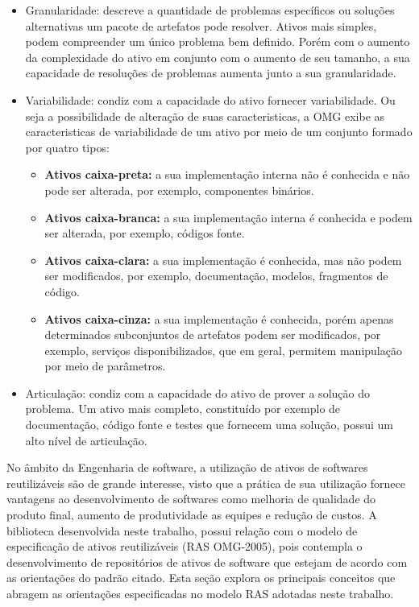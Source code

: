  \begin{itemize}
    \item Granularidade: descreve a quantidade de problemas específicos ou soluções alternativas um pacote de artefatos pode resolver. Ativos mais simples, podem compreender um único problema bem definido. Porém com o aumento da complexidade do ativo em conjunto com o aumento de seu tamanho, a sua capacidade de resoluções de problemas aumenta junto a sua granularidade.
    \item Variabilidade: condiz com a capacidade do ativo fornecer variabilidade. Ou seja a possibilidade de alteração de suas caracteristicas, a OMG exibe as caracteristicas de variabilidade de um ativo por meio de um conjunto formado por quatro tipos:
    \begin{itemize}
         \item \textbf{Ativos caixa-preta:} a sua implementação interna não é conhecida e não pode ser alterada, por exemplo, componentes binários.
        \item \textbf{Ativos caixa-branca:} a sua implementação interna é conhecida e podem ser alterada, por exemplo, códigos fonte.
        \item \textbf{Ativos caixa-clara:} a sua implementação é conhecida, mas não podem ser modificados, por exemplo, documentação, modelos, fragmentos de código.
        \item \textbf{Ativos caixa-cinza:} a sua implementação é conhecida, porém apenas determinados subconjuntos de artefatos podem ser modificados, por exemplo, serviços disponibilizados, que em geral, permitem manipulação por meio de parâmetros.
    \end{itemize}
    
    \item Articulação: condiz com a capacidade do ativo de prover a solução do problema. Um ativo mais completo, constituído por exemplo de documentação, código fonte e testes que fornecem uma solução, possui um alto nível de articulação. 

\end{itemize}

    No âmbito da Engenharia de software, a utilização de ativos de softwares reutilizáveis são de grande interesse, visto que a prática de sua utilização fornece vantagens ao desenvolvimento de softwares como melhoria de qualidade do produto final, aumento de produtividade as equipes e redução de custos.
	A biblioteca desenvolvida neste trabalho, possui relação com o modelo de especificação de ativos reutilizáveis (RAS OMG-2005), pois contempla o desenvolvimento de repositórios de ativos de software que estejam de acordo com as orientações do padrão citado. Esta seção explora os principais conceitos que abragem as orientações especificadas no modelo RAS adotadas neste trabalho.

